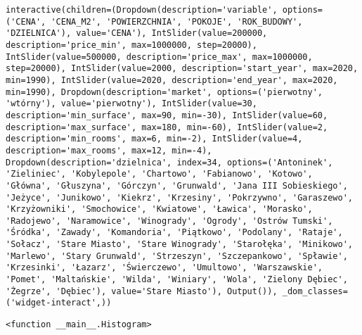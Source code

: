 \documentclass[11pt]{article}
\begin{document}
    
    \begin{verbatim}
interactive(children=(Dropdown(description='variable', options=('CENA', 'CENA_M2', 'POWIERZCHNIA', 'POKOJE', 'ROK_BUDOWY', 'DZIELNICA'), value='CENA'), IntSlider(value=200000, description='price_min', max=1000000, step=20000), IntSlider(value=500000, description='price_max', max=1000000, step=20000), IntSlider(value=2000, description='start_year', max=2020, min=1990), IntSlider(value=2020, description='end_year', max=2020, min=1990), Dropdown(description='market', options=('pierwotny', 'wtórny'), value='pierwotny'), IntSlider(value=30, description='min_surface', max=90, min=-30), IntSlider(value=60, description='max_surface', max=180, min=-60), IntSlider(value=2, description='min_rooms', max=6, min=-2), IntSlider(value=4, description='max_rooms', max=12, min=-4), Dropdown(description='dzielnica', index=34, options=('Antoninek', 'Zieliniec', 'Kobylepole', 'Chartowo', 'Fabianowo', 'Kotowo', 'Główna', 'Głuszyna', 'Górczyn', 'Grunwald', 'Jana III Sobieskiego', 'Jeżyce', 'Junikowo', 'Kiekrz', 'Krzesiny', 'Pokrzywno', 'Garaszewo', 'Krzyżowniki', 'Smochowice', 'Kwiatowe', 'Ławica', 'Morasko', 'Radojewo', 'Naramowice', 'Winogrady', 'Ogrody', 'Ostrów Tumski', 'Śródka', 'Zawady', 'Komandoria', 'Piątkowo', 'Podolany', 'Rataje', 'Sołacz', 'Stare Miasto', 'Stare Winogrady', 'Starołęka', 'Minikowo', 'Marlewo', 'Stary Grunwald', 'Strzeszyn', 'Szczepankowo', 'Spławie', 'Krzesinki', 'Łazarz', 'Świerczewo', 'Umultowo', 'Warszawskie', 'Pomet', 'Maltańskie', 'Wilda', 'Winiary', 'Wola', 'Zielony Dębiec', 'Żegrze', 'Dębiec'), value='Stare Miasto'), Output()), _dom_classes=('widget-interact',))
    \end{verbatim}

    
    
    \begin{verbatim}
<function __main__.Histogram>
    \end{verbatim}

    

    
    
    
    
\end{document}
